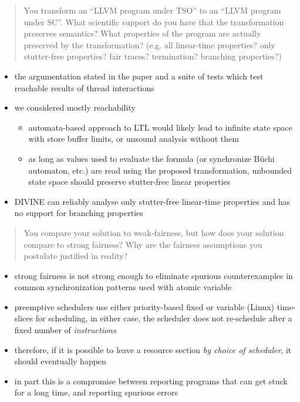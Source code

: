 \documentclass[aspectratio=169, fi]{paradise-slide}
\newcommand{\rquote}[1]{\begin{quote}#1\end{quote}\bigskip\setlength{\leftmargini}{1em}}
\begin{document}
\begin{frame}[noframenumbering]{\qtitle}
  \rquote{You transform an ``LLVM program under TSO'' to an ``LLVM program under SC''. What
  scientific support do you have that the transformation preserves semantics? What properties of the
  program are actually preserved by the transformation? (e.g. all linear-time properties? only
  stutter-free properties? fair traces? termination? branching properties?)}
  \begin{itemize}
    \item the argumentation stated in the paper and a suite of tests which test reachable results of
      thread interactions \pause
    \item we considered mostly reachability
      \begin{itemize}
        \item automata-based approach to LTL would likely lead to infinite state space with store
          buffer limits, or unsound analysis without them
        \item as long as values used to evaluate the formula (or synchronize Büchi automaton, etc.)
          are read using the proposed transformation, unbounded state space should preserve
          stutter-free linear properties
      \end{itemize} \pause
    \item DIVINE can reliably analyse only stutter-free linear-time properties and has no support
      for branching properties
  \end{itemize}
\end{frame}

\begin{frame}[noframenumbering]{\qtitle}
  \rquote{You compare your solution to weak-fairness, but how does your solution compare to strong
    fairness? Why are the fairness assumptions you postulate justified in reality?}
  \begin{itemize}
    \item strong fairness is not strong enough to eliminate spurious counterexamples in common
      synchronization patterns used with atomic variable
    \item preemptive schedulers use either priority-based fixed or variable (Linux) time-slices for
      scheduling, in either case, the scheduler does not re-schedule after a fixed number of
      \emph{instructions}
    \item therefore, if it is possible to leave a resource section \emph{by choice of scheduler},
      it should eventually happen
    \item in part this is a compromise between reporting programs that can get stuck for a long time,
      and reporting spurious errors
  \end{itemize}
\end{frame}
\end{document}
